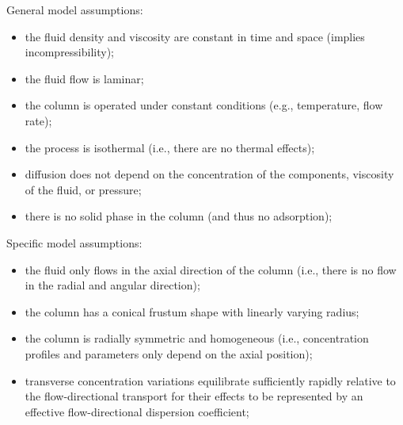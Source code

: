 \documentclass{article}
\begin{document}
General model assumptions:
\begin{itemize}
    \item the fluid density and viscosity are constant in time and space (implies incompressibility);
    \item the fluid flow is laminar;
    \item the column is operated under constant conditions (e.g., temperature, flow rate);
    \item the process is isothermal (i.e., there are no thermal effects);
    \item diffusion does not depend on the concentration of the components, viscosity of the fluid, or pressure;
    \item there is no solid phase in the column (and thus no adsorption);
\end{itemize}

Specific model assumptions:
\begin{itemize}
    \item the fluid only flows in the axial direction of the column (i.e., there is no flow in the radial and angular direction);
    \item the column has a conical frustum shape with linearly varying radius;
    \item the column is radially symmetric and homogeneous (i.e., concentration profiles and parameters only depend on the axial position);
    \item transverse concentration variations equilibrate sufficiently rapidly relative to the flow-directional transport for their effects to be represented by an effective flow-directional dispersion coefficient;
\end{itemize}
\end{document}
